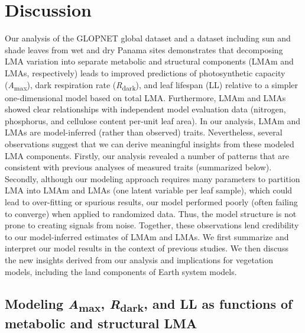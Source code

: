 \documentclass[
  12pt,
  letterpaper,
  DIV=11,
  numbers=noendperiod]{scrartcl}
\begin{document}
\hypertarget{discussion}{%
\section{Discussion}\label{discussion}}

Our analysis of the GLOPNET global dataset and a dataset including sun
and shade leaves from wet and dry Panama sites demonstrates that
decomposing LMA variation into separate metabolic and structural
components (LMAm and LMAs, respectively) leads to improved predictions
of photosynthetic capacity (\emph{A}\textsubscript{max}), dark
respiration rate (\emph{R}\textsubscript{dark}), and leaf lifespan (LL)
relative to a simpler one-dimensional model based on total LMA.
Furthermore, LMAm and LMAs showed clear relationships with independent
model evaluation data (nitrogen, phosphorus, and cellulose content
per-unit leaf area). In our analysis, LMAm and LMAs are model-inferred
(rather than observed) traits. Nevertheless, several observations
suggest that we can derive meaningful insights from these modeled LMA
components. Firstly, our analysis revealed a number of patterns that are
consistent with previous analyses of measured traits (summarized below).
Secondly, although our modeling approach requires many parameters to
partition LMA into LMAm and LMAs (one latent variable per leaf sample),
which could lead to over-fitting or spurious results, our model
performed poorly (often failing to converge) when applied to randomized
data. Thus, the model structure is not prone to creating signals from
noise. Together, these observations lend credibility to our
model-inferred estimates of LMAm and LMAs. We first summarize and
interpret our model results in the context of previous studies. We then
discuss the new insights derived from our analysis and implications for
vegetation models, including the land components of Earth system models.

\hypertarget{modeling-amax-rdark-and-ll-as-functions-of-metabolic-and-structural-lma}{%
\subsection{\texorpdfstring{Modeling \emph{A}\textsubscript{max},
\emph{R}\textsubscript{dark}, and LL as functions of metabolic and
structural
LMA}{Modeling Amax, Rdark, and LL as functions of metabolic and structural LMA}}\label{modeling-amax-rdark-and-ll-as-functions-of-metabolic-and-structural-lma}}
\end{document}
